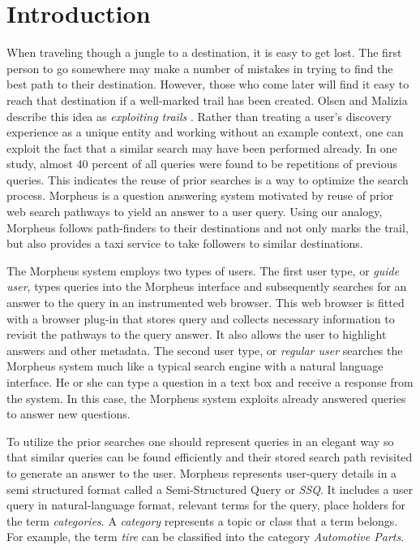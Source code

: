\section{Introduction}



When traveling though a jungle to a destination, it is easy to get
lost.  The first person to go somewhere may make a number of mistakes
in trying to find the best path to their destination.  However, those
who come later will find it easy to reach that destination if a
well-marked trail has been created. Olsen and Malizia describe this
idea as \emph{exploiting trails} \cite{5379671}.  Rather than treating
a user's discovery experience as a unique entity and working without an example
context, one can exploit the fact that a similar search may have been
performed already.  In one study, almost 40 percent of all queries
were found to be repetitions of previous queries\cite{1277770}. This
indicates the reuse of prior searches is a way to optimize the search
process.  Morpheus is a question answering system motivated by reuse of prior web search pathways to yield an answer to a user query. Using our analogy, Morpheus follows path-finders to their destinations and not only marks the trail, but also provides a taxi service to take followers to similar destinations.

The Morpheus system employs two types of users. The first user type, or \textit{guide user}, types queries into the Morpheus interface and subsequently searches for an answer to the query in an instrumented web browser. This web browser is fitted with a browser plug-in that stores query and collects necessary information to revisit the pathways to the query answer. It also allows the user to highlight answers and other metadata. The second user type, or \textit{regular user} searches the Morpheus system much like a typical search engine with a natural language interface. He or she can type a question in a text box and receive a response from the system. In this case, the Morpheus system exploits already answered queries to answer new questions.

To utilize the prior searches one should represent queries in an elegant way so that similar queries can be found efficiently and their stored search path revisited to generate an answer to the user. Morpheus represents user-query details in a semi structured format called a Semi-Structured Query or \textit{SSQ}. It includes a user query in natural-language format, relevant terms for the query, place holders for the term \textit{categories}. A \textit{category} represents a topic or class that a term belongs. For example, the term \textit{tire} can be classified into the category \textit{Automotive Parts}.

